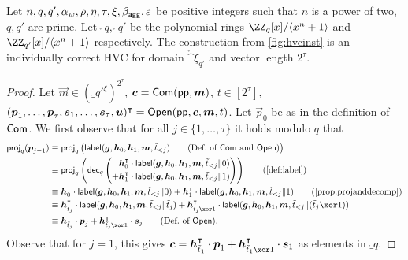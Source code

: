 \begin{lemma}\label{lem:veccomcorrectness}
  Let $n,q,q',\alpha_w,\rho,\eta,\tau,\xi,\beta_{\mathsf{agg}},\varepsilon$ be positive integers such that $n$ is a power of two, $q,q'$ are prime.
  Let $\ring_q,\ring_{q'}$ be the polynomial rings $\ZZ_q[x]/\langle x^n+1\rangle$ and $\ZZ_{q'}[x]/\langle x^n+1\rangle$ respectively.
  The construction from \autoref{fig:hvcinst} is an individually correct HVC for domain $\ring^\xi_{q'}$ and vector length $2^\tau$.
\end{lemma}
\begin{proof}
Let $\vec{m} \in (\ring_{q'}^{\xi})^{2^\tau}$, $\boldsymbol{c} = \mathsf{Com}(\mathsf{pp},\boldsymbol{m})$, $t\in[2^\tau]$, $(\boldsymbol{p}_1,\dots,\boldsymbol{p}_{\tau},\boldsymbol{s}_1, \dots, \boldsymbol{s}_{\tau},\boldsymbol{u})^\intercal = \mathsf{Open}(\mathsf{pp},\boldsymbol{c},\boldsymbol{m},t)$. Let $\vec{p}_{0}$ be as in the definition of $\mathsf{Com}$.
We first observe that for all $j\in\{1,\ldots,\tau\}$ it holds modulo $q$ that
\begin{align*}
  \proj_q(\vec{p}_{j-1})
  \equiv{}&\proj_q\left(\lbl(\vec{g},\vec{h}_0,\vec{h}_1,\vec{m},\tilde t_{< j})\tag{Def.\ of $\commit$ and $\open$}\right)\\
  \equiv{}&\proj_q\left(\decomp_q\left(
      \begin{aligned}
        &\vec{h}_0^\transpose \cdot\lbl(\vec{g},\vec{h}_0,\vec{h}_1,\vec{m},\tilde t_{< j}\Vert 0)\\
        +& \vec{h}_1^\transpose \cdot\lbl(\vec{g},\vec{h}_0,\vec{h}_1,\vec{m},\tilde t_{< j}\Vert 1)
      \end{aligned}
    \right)\right)\tag{\autoref{def:label}}\\
  \equiv{}&\vec{h}_0^\transpose \cdot\lbl(\vec{g},\vec{h}_0,\vec{h}_1,\vec{m},\tilde t_{< j}\Vert 0) + \vec{h}_1^\transpose \cdot\lbl(\vec{g},\vec{h}_0,\vec{h}_1,\vec{m},\tilde t_{< j}\Vert 1)\tag{\autoref{prop:projanddecomp}}\\
  \equiv{}&\vec{h}_{\tilde t_{j}}^\transpose \cdot\lbl(\vec{g},\vec{h}_0,\vec{h}_1,\vec{m},\tilde t_{< j}\Vert \tilde t_{j}) + \vec{h}_{\tilde t_{j}\xor 1}^\transpose \cdot\lbl(\vec{g},\vec{h}_0,\vec{h}_1,\vec{m},\tilde t_{< j}\Vert (\tilde t_{j}\xor 1))\\
  \equiv{}&\vec{h}_{\tilde t_{j}}^\transpose \cdot\vec{p}_{j} + \vec{h}_{\tilde t_{j}\xor 1}^\transpose \cdot\vec{s}_{j}\tag{Def.\ of $\open$}.
\end{align*}
Observe that for $j=1$, this gives $\vec{c} = \vec{h}_{\tilde t_1}^\transpose\cdot \vec{p}_{1} + \vec{h}_{\tilde t_1 \xor 1}^\transpose \cdot \vec{s}_{1}$ as elements in $\ring_q$.

\end{proof}
